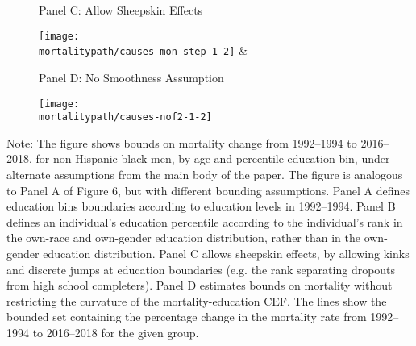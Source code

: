 \documentclass[12pt,letterpaper]{article}
\begin{document}
\begin{figure}[H]
  \begin{center}
    \vspace{-.6cm}
    Panel C: Allow Sheepskin Effects
  \end{center}
  \begin{center}
    \texttt{[image: \\mortalitypath/causes-mon-step-1-2]} &
  \end{center}
  \begin{center}
    \vspace{-.6cm}
    Panel D: No Smoothness Assumption
  \end{center}
  \begin{center}
    \texttt{[image: \\mortalitypath/causes-nof2-1-2]} \\
  \end{center}
\end{figure}
\vspace{-1cm}
\tiny{Note: The figure shows bounds on mortality change from 1992--1994 to 2016--2018, for non-Hispanic black men, by age and percentile education bin, under alternate assumptions from the main body of the paper. The figure is analogous to Panel A of Figure 6, but with different bounding assumptions. Panel A defines education bins boundaries according to education levels in 1992--1994. Panel B defines an individual's education percentile according to the individual's rank in the own-race and own-gender education distribution, rather than in the own-gender education distribution. Panel C allows sheepskin effects, by allowing kinks and discrete jumps at education boundaries (e.g. the rank separating dropouts from high school completers). Panel D estimates bounds on mortality without restricting the curvature of the mortality-education CEF.  The lines show the bounded set containing the percentage change in the mortality rate from 1992--1994 to 2016--2018 for the given group.}
\end{document}
